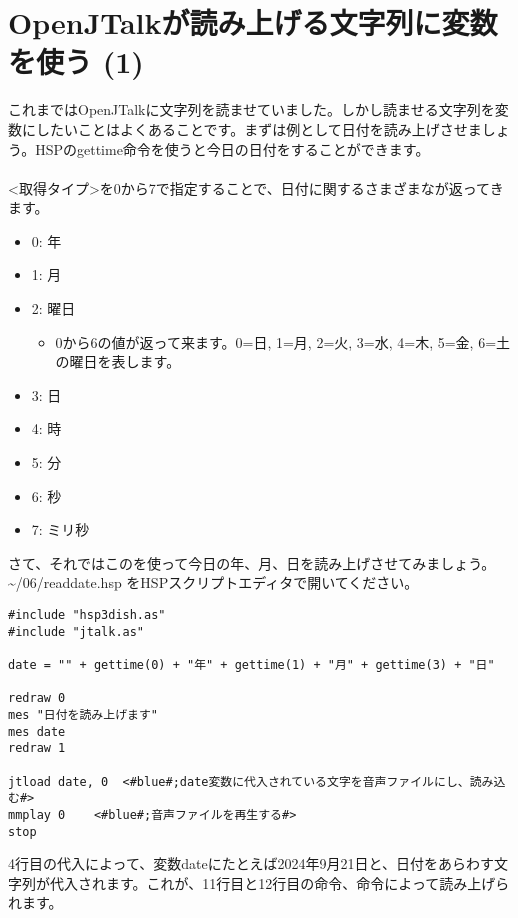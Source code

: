 \newpage
\section{OpenJTalkが読み上げる文字列に変数を使う (1)}
これまではOpenJTalkに文字列を読ませていました。しかし読ませる文字列を変数にしたいことはよくあることです。まずは例として日付を読み上げさせましょう。HSPのgettime命令を使うと今日の日付をすることができます。\\
\\
<取得タイプ>を0から7で指定することで、日付に関するさまざまなが返ってきます。
\begin{itemize}
\item 0: 年
\item 1: 月
\item 2: 曜日
\begin{itemize}
 \item 0から6の値が返って来ます。0=日, 1=月, 2=火, 3=水, 4=木, 5=金, 6=土 の曜日を表します。
\end{itemize}
\item 3: 日
\item 4: 時
\item 5: 分
\item 6: 秒
\item 7: ミリ秒
\end{itemize}
さて、それではこのを使って今日の年、月、日を読み上げさせてみましょう。 \textasciitilde /06/readdate.hsp をHSPスクリプトエディタで開いてください。\\

\begin{lstlisting}[caption=readdate.hsp,label=readdate.hsp]
#include "hsp3dish.as"
#include "jtalk.as"

date = "" + gettime(0) + "年" + gettime(1) + "月" + gettime(3) + "日"

redraw 0
mes "日付を読み上げます"
mes date
redraw 1

jtload date, 0	<#blue#;date変数に代入されている文字を音声ファイルにし、読み込む#>
mmplay 0	<#blue#;音声ファイルを再生する#>
stop
\end{lstlisting}

4行目の代入によって、変数dateにたとえば2024年9月21日と、日付をあらわす文字列が代入されます。これが、11行目と12行目の命令、命令によって読み上げられます。\\

\begin{tcolorbox}[title=\useOmetoi]
\begin{enumerate}
\end{enumerate}
\end{tcolorbox}
